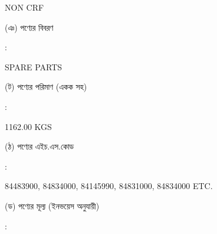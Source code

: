 \documentclass[12pt]{article}
\newcommand{\good}{SPARE PARTS}
\newcommand{\pkg}{1162.00 KGS}
\newcommand{\crf}{NON CRF}
\newcommand{\crfdt}{}
\newcommand{\hscode}{84483900, 84834000, 84145990, 84831000, 84834000 ETC.  }
\begin{document}
\begin{minipage}[t]{0.53\linewidth}
{\crf} \hspace{2em} {\crfdt}
\\
\end{minipage}
\begin{minipage}[t]{0.05\linewidth}
\hspace*{1em}
\end{minipage}
\begin{minipage}[t]{0.40\linewidth}
(ঞ) পণ্যের বিবরণ
\end{minipage}
\begin{minipage}[t]{0.02\linewidth}
:
\end{minipage}
\begin{minipage}[t]{0.53\linewidth}
{\good}
\\
\end{minipage}
\begin{minipage}[t]{0.05\linewidth}
\hspace*{1em}
\end{minipage}
\begin{minipage}[t]{0.40\linewidth}
(ট) পণ্যের পরিমাণ (একক সহ)
\end{minipage}
\begin{minipage}[t]{0.02\linewidth}
:
\end{minipage}
\begin{minipage}[t]{0.53\linewidth}
{\pkg}
\\
\end{minipage}
\begin{minipage}[t]{0.05\linewidth}
\hspace*{1em}
\end{minipage}
\begin{minipage}[t]{0.40\linewidth}
(ঠ) পণ্যের এইচ.এস.কোড
\end{minipage}
\begin{minipage}[t]{0.02\linewidth}
:
\end{minipage}
\begin{minipage}[t]{0.53\linewidth}
{\hscode}
\\
\end{minipage}
\begin{minipage}[t]{0.05\linewidth}
\hspace*{1em}
\end{minipage}
\begin{minipage}[t]{0.40\linewidth}
(ড) পণ্যের মূল্য (ইনভয়েস অনুযায়ী)
\end{minipage}
\begin{minipage}[t]{0.02\linewidth}
:
\end{minipage}
\end{document}
